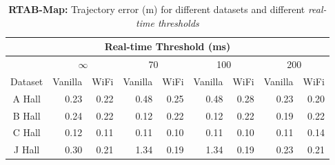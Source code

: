 \begin{table}
\caption{{\bf RTAB-Map:} Trajectory error (m) for different datasets and different {\it real-time thresholds}}
\begin{center}
\begin{tabular}{| c | r r | r r | r r | r r | } 
\hline 
\multicolumn{9}{|c|}{Real-time Threshold (ms)} \\ 
\hline 
 & \multicolumn{2}{|c|}{$\infty$} & \multicolumn{2}{|c|}{70} & \multicolumn{2}{|c|}{100} & \multicolumn{2}{|c|}{200} \\ 
\hline 
 Dataset & \multicolumn{1}{|c|}{Vanilla} & \multicolumn{1}{|c|}{WiFi} & \multicolumn{1}{|c|}{Vanilla} & \multicolumn{1}{|c|}{WiFi} & \multicolumn{1}{|c|}{Vanilla} & \multicolumn{1}{|c|}{WiFi} & \multicolumn{1}{|c|}{Vanilla} & \multicolumn{1}{|c|}{WiFi} \\ 
\hline 
 A Hall & 0.23 & 0.22 & 0.48 & 0.25 & 0.48 & 0.28 & 0.23 & 0.20 \\ 
 B Hall & 0.24 & 0.22 & 0.12 & 0.22 & 0.12 & 0.22 & 0.19 & 0.22 \\ 
 C Hall & 0.12 & 0.11 & 0.11 & 0.10 & 0.11 & 0.10 & 0.11 & 0.14 \\ 
 J Hall & 0.30 & 0.21 & 1.34 & 0.19 & 1.34 & 0.19 & 0.23 & 0.21 \\ 
\hline 
\end{tabular} 
\label{table:rtabmap_rmse}
\end{center}
\end{table}

